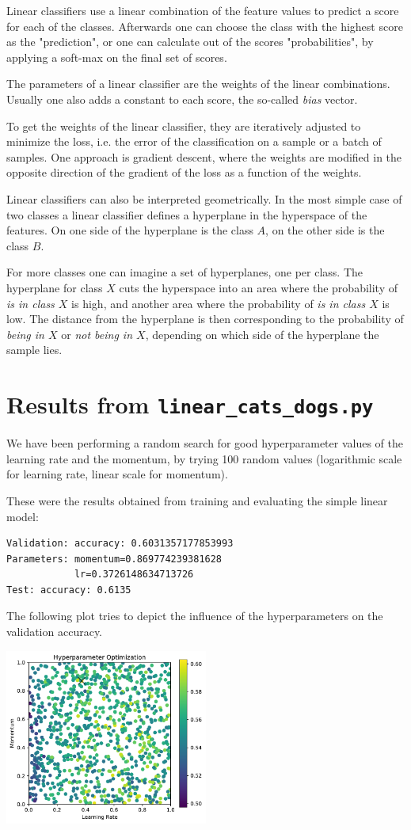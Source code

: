 \documentclass[sigconf,nonacm]{acmart}
\begin{document}
Linear classifiers use a linear combination of the feature values
to predict a score for each of the classes.
Afterwards one can choose the class with the highest score
as the "prediction", or one can calculate out of the scores
"probabilities", by applying a soft-max on the final set of scores.

The parameters of a linear classifier are the weights of the linear
combinations.
Usually one also adds a constant to each score, the so-called \emph{bias}
vector.

To get the weights of the linear classifier, they are iteratively
adjusted to minimize the loss, i.e. the error of the classification
on a sample or a batch of samples.
One approach is gradient descent, where the weights are modified
in the opposite direction of the gradient of the loss as a function
of the weights.

Linear classifiers can also be interpreted geometrically.
In the most simple case of two classes a linear classifier defines
a hyperplane in the hyperspace of the features.
On one side of the hyperplane is the class $A$,
on the other side is the class $B$.

For more classes one can imagine a set of hyperplanes, one per class.
The hyperplane for class $X$ cuts the hyperspace into an area
where the probability of \emph{is in class $X$} is high,
and another area where the probability of \emph{is in class $X$}
is low.
The distance from the hyperplane is then corresponding to the
probability of \emph{being in $X$} or \emph{not being in $X$},
depending on which side of the hyperplane the sample lies.

\section{Results from \texttt{linear\_cats\_dogs.py}}
We have been performing a random search for good hyperparameter
values of the learning rate and the momentum, by trying 100 random
values (logarithmic scale for learning rate, linear scale for momentum).

These were the results obtained from training and evaluating
the simple linear model:
\begin{lstlisting}[basicstyle=\ttfamily\small]
Validation: accuracy: 0.6031357177853993
Parameters: momentum=0.869774239381628
            lr=0.3726148634713726
Test: accuracy: 0.6135
\end{lstlisting}

The following plot tries to depict the influence of the hyperparameters
on the validation
accuracy.

\includegraphics[width=0.5\textwidth]{plot.pdf}



\end{document}
